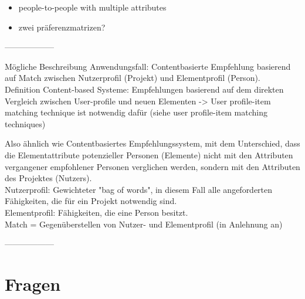 \begin{itemize}
\begin{itemize}
    \end{itemize}
    \begin{itemize}
        \item people-to-people with multiple attributes %
    \end{itemize}
    \begin{itemize}
        \item zwei präferenzmatrizen? %
    \end{itemize}
\end{itemize}

------------------

Mögliche Beschreibung Anwendungsfall: %
Contentbasierte Empfehlung basierend auf Match zwischen Nutzerprofil (Projekt) und Elementprofil (Person).\\
Definition Content-based Systeme: Empfehlungen basierend auf dem direkten Vergleich zwischen User-profile und neuen Elementen -> User profile-item matching technique ist notwendig dafür (siehe user profile-item matching techniques) %

Also ähnlich wie Contentbasiertes Empfehlungssystem, mit dem Unterschied, dass die Elementattribute potenzieller Personen (Elemente) nicht mit den Attributen vergangener empfohlener Personen verglichen werden, sondern mit den Attributen des Projektes (Nutzers).\\
Nutzerprofil: Gewichteter "bag of words", in diesem Fall alle angeforderten Fähigkeiten, die für ein Projekt notwendig sind.\\
Elementprofil: Fähigkeiten, die eine Person besitzt.\\
Match = Gegenüberstellen von  Nutzer- und Elementprofil (in Anlehnung an) %

------------------

\newpage

\section{Fragen}
\label{ch:notizen:fragen}

